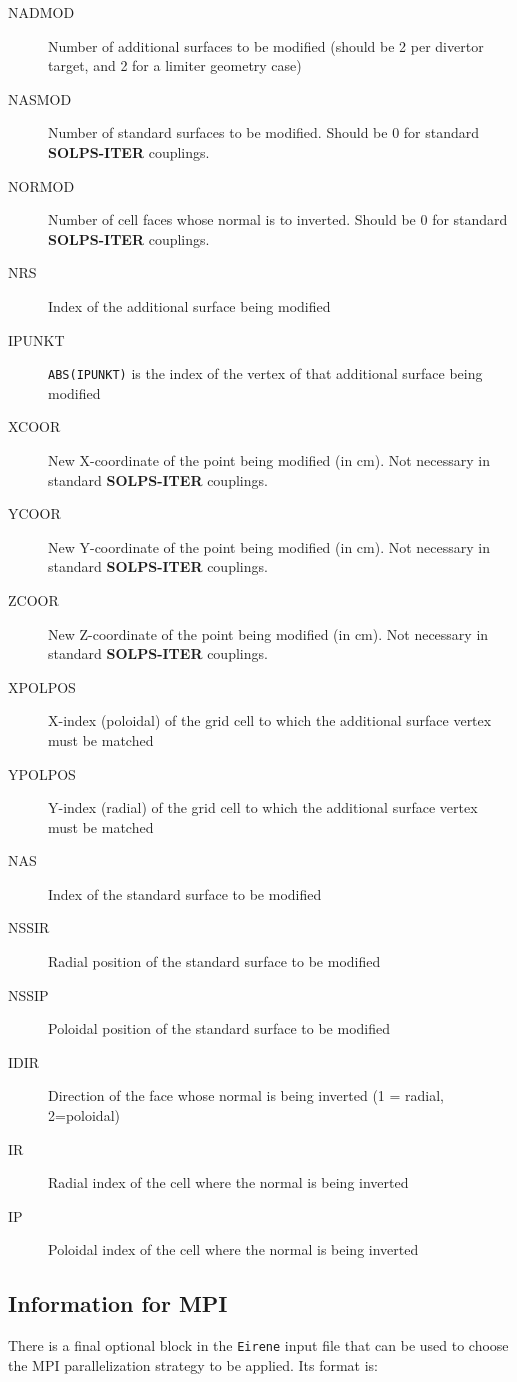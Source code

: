 \documentclass[a4paper,10pt]{report}
\newcommand\SOLPSITER{{\bf SOLPS-ITER} }
\begin{document}
\begin{description}
  \item[NADMOD] Number of additional surfaces to be modified (should be 2 per divertor target, and 2 for a limiter geometry case)
  \item[NASMOD] Number of standard surfaces to be modified. Should be 0 for standard \SOLPSITER couplings.
  \item[NORMOD] Number of cell faces whose normal is to inverted. Should be 0 for standard \SOLPSITER couplings.
  \item[NRS] Index of the additional surface being modified
  \item[IPUNKT] {\tt ABS(IPUNKT)} is the index of the vertex of that additional surface being modified
  \item[XCOOR] New X-coordinate of the point being modified (in cm). Not necessary in standard \SOLPSITER couplings.
  \item[YCOOR] New Y-coordinate of the point being modified (in cm). Not necessary in standard \SOLPSITER couplings.
  \item[ZCOOR] New Z-coordinate of the point being modified (in cm). Not necessary in standard \SOLPSITER couplings.
  \item[XPOLPOS] X-index (poloidal) of the grid cell to which the additional surface vertex must be matched
  \item[YPOLPOS] Y-index (radial) of the grid cell to which the additional surface vertex must be matched
  \item[NAS] Index of the standard surface to be modified
  \item[NSSIR] Radial position of the standard surface to be modified
  \item[NSSIP] Poloidal position of the standard surface to be modified
  \item[IDIR] Direction of the face whose normal is being inverted (1 = radial, 2=poloidal)
  \item[IR] Radial index of the cell where the normal is being inverted
  \item[IP] Poloidal index of the cell where the normal is being inverted
\end{description}

\subsection{Information for MPI}

There is a final optional block in the {\tt Eirene} input file that can be used to choose the MPI parallelization strategy to be applied. Its format is:
\end{document}
